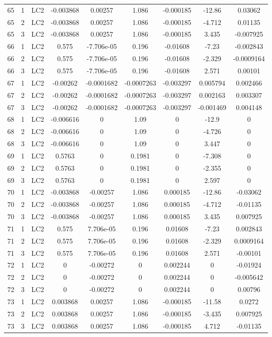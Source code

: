 \documentclass{article}%
\begin{document}
\begin{longtable}{| c c c | c c c c c c |}
65&1&LC2&{-}0.003868&0.00257&1.086&{-}0.000185&{-}12.86&0.03062\\%
65&2&LC2&{-}0.003868&0.00257&1.086&{-}0.000185&{-}4.712&0.01135\\%
65&3&LC2&{-}0.003868&0.00257&1.086&{-}0.000185&3.435&{-}0.007925\\%
66&1&LC2&0.575&{-}7.706e{-}05&0.196&{-}0.01608&{-}7.23&{-}0.002843\\%
66&2&LC2&0.575&{-}7.706e{-}05&0.196&{-}0.01608&{-}2.329&{-}0.0009164\\%
66&3&LC2&0.575&{-}7.706e{-}05&0.196&{-}0.01608&2.571&0.00101\\%
67&1&LC2&{-}0.00262&{-}0.0001682&{-}0.0007263&{-}0.003297&0.005794&0.002466\\%
67&2&LC2&{-}0.00262&{-}0.0001682&{-}0.0007263&{-}0.003297&0.002163&0.003307\\%
67&3&LC2&{-}0.00262&{-}0.0001682&{-}0.0007263&{-}0.003297&{-}0.001469&0.004148\\%
68&1&LC2&{-}0.006616&0&1.09&0&{-}12.9&0\\%
68&2&LC2&{-}0.006616&0&1.09&0&{-}4.726&0\\%
68&3&LC2&{-}0.006616&0&1.09&0&3.447&0\\%
69&1&LC2&0.5763&0&0.1981&0&{-}7.308&0\\%
69&2&LC2&0.5763&0&0.1981&0&{-}2.355&0\\%
69&3&LC2&0.5763&0&0.1981&0&2.597&0\\%
70&1&LC2&{-}0.003868&{-}0.00257&1.086&0.000185&{-}12.86&{-}0.03062\\%
70&2&LC2&{-}0.003868&{-}0.00257&1.086&0.000185&{-}4.712&{-}0.01135\\%
70&3&LC2&{-}0.003868&{-}0.00257&1.086&0.000185&3.435&0.007925\\%
71&1&LC2&0.575&7.706e{-}05&0.196&0.01608&{-}7.23&0.002843\\%
71&2&LC2&0.575&7.706e{-}05&0.196&0.01608&{-}2.329&0.0009164\\%
71&3&LC2&0.575&7.706e{-}05&0.196&0.01608&2.571&{-}0.00101\\%
72&1&LC2&0&{-}0.00272&0&0.002244&0&{-}0.01924\\%
72&2&LC2&0&{-}0.00272&0&0.002244&0&{-}0.005642\\%
72&3&LC2&0&{-}0.00272&0&0.002244&0&0.00796\\%
73&1&LC2&0.003868&0.00257&1.086&{-}0.000185&{-}11.58&0.0272\\%
73&2&LC2&0.003868&0.00257&1.086&{-}0.000185&{-}3.435&0.007925\\%
73&3&LC2&0.003868&0.00257&1.086&{-}0.000185&4.712&{-}0.01135\\%

\end{longtable}
\end{document}
